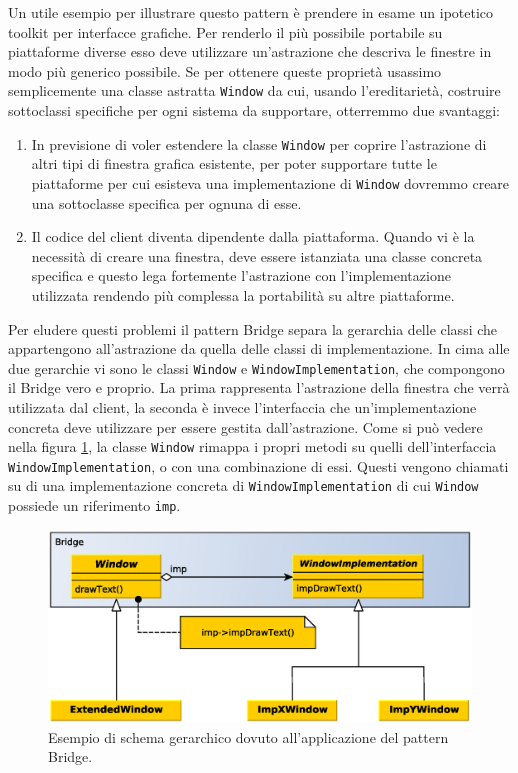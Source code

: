 Un utile esempio per illustrare questo pattern \`e prendere in esame un ipotetico toolkit per interfacce grafiche. Per renderlo il pi\`u possibile portabile su piattaforme diverse esso deve utilizzare un'astrazione che descriva le finestre in modo pi\`u generico possibile. Se per ottenere queste propriet\`a usassimo semplicemente una classe astratta \texttt{Window} da cui, usando l'ereditariet\`a, costruire sottoclassi specifiche per ogni sistema da supportare, otterremmo due svantaggi:
\begin{enumerate}
	\item In previsione di voler estendere la classe \texttt{Window} per coprire l'astrazione di altri tipi di finestra grafica esistente, per poter supportare tutte le piattaforme per cui esisteva una implementazione di \texttt{Window} dovremmo creare una sottoclasse specifica per ognuna di esse.
	\item Il codice del client diventa dipendente dalla piattaforma. Quando vi \`e la necessit\`a di creare una finestra, deve essere istanziata una classe concreta specifica e questo lega fortemente l'astrazione con l'implementazione utilizzata rendendo pi\`u complessa la portabilit\`a su altre piattaforme.
\end{enumerate}
Per eludere questi problemi il pattern Bridge separa la gerarchia delle classi che appartengono all'astrazione da quella delle classi di implementazione. In cima alle due gerarchie vi sono le classi \texttt{Window} e \texttt{WindowImplementation}, che compongono il Bridge vero e proprio. La prima rappresenta l'astrazione della finestra che verr\`a utilizzata dal client, la seconda \`e invece l'interfaccia che un'implementazione concreta deve utilizzare per essere gestita dall'astrazione.
Come si pu\`o vedere nella figura \ref{f:bridgepattern}, la classe \texttt{Window} rimappa i propri metodi su quelli dell'interfaccia \texttt{WindowImplementation}, o con una combinazione di essi. Questi vengono chiamati su di una implementazione concreta di \texttt{WindowImplementation} di cui \texttt{Window} possiede un riferimento \texttt{imp}.

\begin{figure}
\begin{center}
\includegraphics[width=12cm]{Immagini/BridgePattern}
\caption[Schema gerarchico dell'applicazione del pattern Bridge.]{Esempio di schema gerarchico dovuto all'applicazione del pattern Bridge.\label{f:bridgepattern}} 
\end{center} 
\end{figure}

